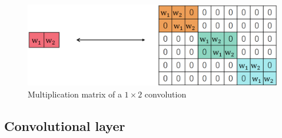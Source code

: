 \begin{descriptionlist}
\begin{description}
                \begin{figure}[H]
                    \centering
                    \includegraphics[width=0.45\linewidth]{./img/convolution_matrix.png}
                    \caption{Multiplication matrix of a $1 \times 2$ convolution}
                \end{figure}
        \end{description}
\end{descriptionlist}


\subsection{Convolutional layer}

